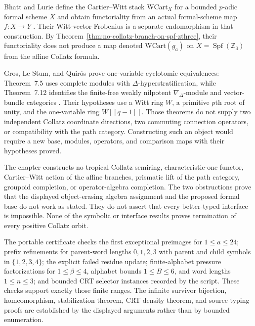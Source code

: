 \begin{sourceissue}
\label{sourceissue:prismatic-functoriality-boundary}
Bhatt and Lurie define the Cartier--Witt stack $\mathrm{WCart}_X$ for a
bounded $p$-adic formal scheme $X$ and obtain functoriality from an actual
formal-scheme map $f:X\to Y$
\cite[source TeX lines 480--550]{BhattLurie2022}.  Their Witt-vector
Frobenius is a separate endomorphism in that construction.  By
Theorem~\ref{thm:no-collatz-branch-on-spf-zthree}, their functoriality does
not produce a map denoted $\mathrm{WCart}(g_a)$ on
$X=\operatorname{Spf}(\mathbb Z_3)$ from the affine Collatz formula.

Gros, Le Stum, and Quir\'os prove one-variable cyclotomic equivalences:
Theorem~7.5 uses complete modules with $\Delta$-hyperstratification, while
Theorem~7.12 identifies the finite-free weakly nilpotent
$\nabla_\Delta$-module and vector-bundle categories
\cite[Theorems 7.5 and 7.12]{GrosLeStumQuiros2023v3}.  Their hypotheses use a
Witt ring $W$, a primitive $p$th root of unity, and the one-variable ring
$W[[q-1]]$.  Those theorems do not supply two independent Collatz coordinate
directions, two commuting connection operators, or compatibility with the
path category.  Constructing such an object would require a new base,
modules, operators, and comparison maps with their hypotheses proved.
\end{sourceissue}

\begin{nonclaim}
The chapter constructs no tropical Collatz semiring, characteristic-one
functor, Cartier--Witt action of the affine branches, prismatic lift of the
path category, groupoid completion, or operator-algebra completion.  The two
obstructions prove that the displayed object-erasing algebra assignment and
the proposed formal base do not work as stated.  They do not assert that every
better-typed interface is impossible.  None of the symbolic or interface
results proves termination of every positive Collatz orbit.
\end{nonclaim}

The portable certificate
 checks the first exceptional
preimages for $1\leq a\leq24$; prefix refinements for parent-word lengths
$0,1,2,3$ with parent and child symbols in $\{1,2,3,4\}$; the explicit failed
residue update; finite-alphabet pressure factorizations for
$1\leq\beta\leq4$, alphabet bounds $1\leq B\leq6$, and word lengths
$1\leq n\leq3$; and bounded CRT selector instances recorded by the script.
These checks support exactly those finite ranges.  The infinite survivor
bijection, homeomorphism, stabilization theorem, CRT density theorem, and
source-typing proofs are established by the displayed arguments rather than
by bounded enumeration.
